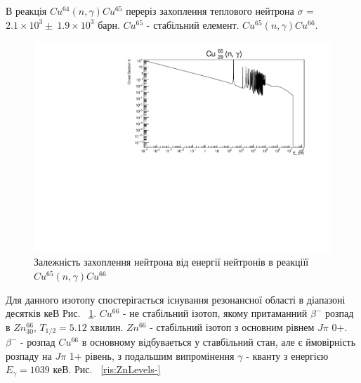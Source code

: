 \documentclass[a4paper, 14pt]{article}
\numberwithin{equation}{section}
\numberwithin{table}{section}
\begin{document}
В реакція $Cu^{64}(n, \gamma)Cu^{65}$ переріз захоплення теплового нейтрона $\sigma$ = $2.1 \times 10^3 \pm \ 1.9 \times 10^3$ барн. $Cu^{65}$ - стабільний елемент. $Cu^{65}(n,\gamma)Cu^{66}$.
\begin{figure}[hbt!]
	\centering \includegraphics[width=1\textwidth]{sigma/Cu65Sigma.pdf}
	\caption{Залежність захоплення нейтрона від енергії нейтронів в реакціїї  $Cu^{65}(n,\gamma)Cu^{66}$} 
	\label{ris:CuSigma}	
\end{figure} 
Для данного изотопу спостерігається існування резонансної області в діапазоні десятків кеВ Рис. ~\ref{ris:CuSigma}. 
$Cu^{66}$ - не стабільний ізотоп, якому притаманний $\beta^-$ розпад в $Zn^{66}_{30}$, $T_{1/2} = 5.12$ хвилин. 
$Zn^{66}$ - стабільний ізотоп з основним рівнем $J\pi$ 0+. $\beta^-$ - розпад $Cu^{66}$ в основному відбуваеться у ставбільний стан, але є ймовірність розпаду на $J\pi$ 1+ рівень, з подальшим випромінення $\gamma$ - кванту з енергією $E_{\gamma} = 1039$ кеВ. Рис. ~\ref{ris:ZnLevels-}
\\
\end{document}
